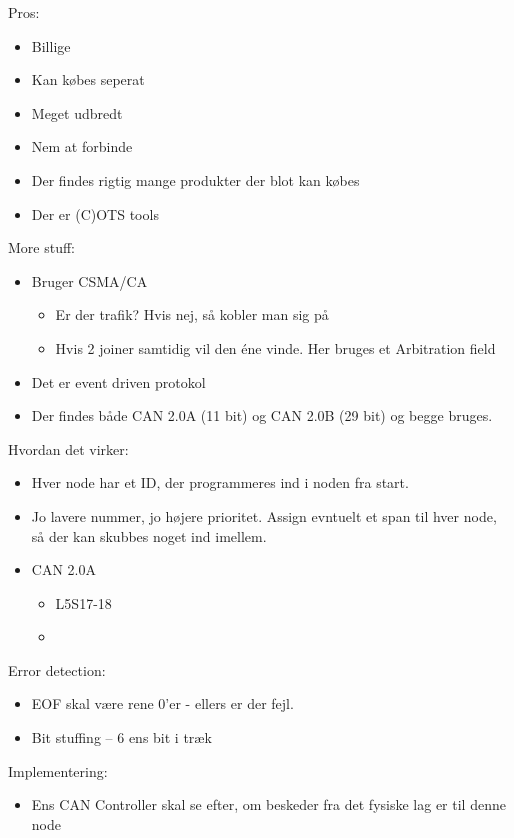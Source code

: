 \documentclass[oneside, 10pt]{article}
\begin{document}
Pros:
\begin{itemize}
	\item Billige
	\item Kan købes seperat
	\item Meget udbredt
	\item Nem at forbinde
	\item Der findes rigtig mange produkter der blot kan købes
	\item Der er (C)OTS tools
\end{itemize}

More stuff:
\begin{itemize}
	\item Bruger CSMA/CA
	\begin{itemize}
		\item Er der trafik? Hvis nej, så kobler man sig på
		\item Hvis 2 joiner samtidig vil den éne vinde. Her bruges et Arbitration field
	\end{itemize}
	\item Det er event driven protokol
	\item Der findes både CAN 2.0A (11 bit) og CAN 2.0B (29 bit) og begge bruges.
\end{itemize}

Hvordan det virker:
\begin{itemize}
	\item Hver node har et ID, der programmeres ind i noden fra start.
	\item Jo lavere nummer, jo højere prioritet. Assign evntuelt et span til hver node, så der kan skubbes noget ind imellem.
	\item CAN 2.0A
	\begin{itemize}
		\item L5S17-18
		\item 
	\end{itemize}
\end{itemize}

Error detection:
\begin{itemize}
	\item EOF skal være rene 0'er - ellers er der fejl.
	\item Bit stuffing -- 6 ens bit i træk
\end{itemize}

Implementering:
\begin{itemize}
	\item Ens CAN Controller skal se efter, om beskeder fra det fysiske lag er til denne node
\end{itemize}
\end{document}
